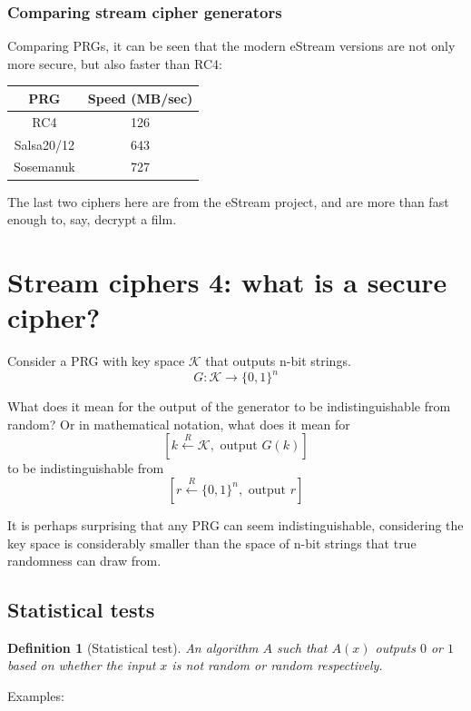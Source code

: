 \documentclass[10pt,a4paper]{report}
\newtheorem{definition}{Definition}[section]
\begin{document}
\subsubsection*{Comparing stream cipher generators}

Comparing PRGs, it can be seen that the modern eStream versions are not only more secure, but also
faster than RC4:

\begin{center}
\begin{tabular}{ c | c }
    PRG & Speed (MB/sec) \\
    \hline
    RC4 & 126 \\
    Salsa20/12 & 643 \\
    Sosemanuk & 727 \\
\end{tabular}
\end{center}

The last two ciphers here are from the eStream project, and are more than fast enough to, say,
decrypt a film.

\section{Stream ciphers 4: what is a secure cipher?}

Consider a PRG with key space $\mathcal{K}$ that outputs n-bit strings.
    $$ G \colon \mathcal{K} \to \{0, 1\}^n $$

What does it mean for the output of the generator to be indistinguishable from random? Or in
mathematical notation, what does it mean for
    $$ [k \xleftarrow{R} \mathcal{K}, \text{ output } G(k)] $$
to be indistinguishable from
    $$ [r \xleftarrow{R} \{0, 1\}^n, \text{ output } r] $$

It is perhaps surprising that any PRG can seem indistinguishable, considering the key space is
considerably smaller than the space of n-bit strings that true randomness can draw from.

\subsection{Statistical tests}

\begin{definition}[Statistical test]
    An algorithm $A$ such that $A(x)$ outputs $0$ or $1$ based on whether the input $x$ is not
    random or random respectively.
\end{definition}

\noindent
Examples:
\end{document}
